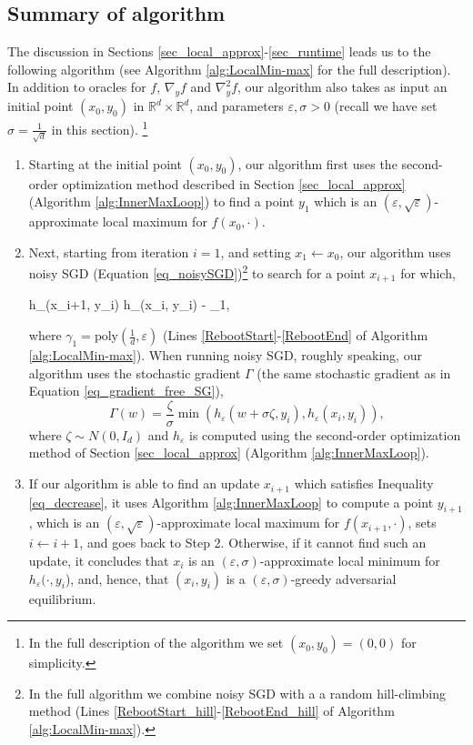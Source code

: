 \documentclass[11pt,letterpaper]{article}
\renewcommand{\epsilon}{\varepsilon}
\def \be{\begin{equs}}
\def \ee{\end{equs}}
\begin{document}
\subsection{Summary of algorithm}
The discussion in Sections \ref{sec_local_approx}-\ref{sec_runtime} leads us to the following algorithm (see Algorithm \ref{alg:LocalMin-max} for the full description). 
%
%
In addition to oracles for $f$, $\nabla_y f$ and $\nabla^2_y f$, our algorithm also takes as input an initial point $(x_0, y_0)$ in $\mathbb{R}^d \times \mathbb{R}^d$, and parameters $\epsilon, \sigma >0$  (recall we have set $\sigma = \frac{1}{\sqrt{d}}$ in this section). \footnote{In the full description of the algorithm we set  $(x_0, y_0) = (0, 0)$ for simplicity.}

\begin{enumerate}
\item  Starting at the initial point $(x_0, y_0)$, our algorithm first uses the second-order optimization method described in Section \ref{sec_local_approx} (Algorithm \ref{alg:InnerMaxLoop}) to find a point $y_1$ which is an  $(\epsilon, \sqrt{\epsilon})$-approximate local maximum for $f(x_0, \cdot)$.

\item Next, starting from iteration $i=1$, and setting $x_1 \leftarrow x_0$,  our algorithm uses noisy SGD (Equation \eqref{eq_noisySGD})\footnote{In the full algorithm we combine noisy SGD with a a random hill-climbing method (Lines \ref{RebootStart_hill}-\ref{RebootEnd_hill}  of Algorithm \ref{alg:LocalMin-max}).}
 to search for a point $x_{i+1}$ for which,
\be \label{eq_decrease}
 h_\epsilon(x_{i+1}, y_{i}) \leq h_\epsilon(x_i, y_{i})  - \gamma_1,
\ee
   where $\gamma_1 = \mathrm{poly}(\frac{1}{d},  \epsilon)$ (Lines \ref{RebootStart}-\ref{RebootEnd} of Algorithm \ref{alg:LocalMin-max}).
   When running noisy SGD, roughly speaking, our algorithm uses the stochastic gradient $\Gamma$ (the same stochastic gradient as in Equation \eqref{eq_gradient_free_SG}),
   \begin{equation}
 \Gamma(w) = \frac{\zeta}{\sigma} \min \left(h_\epsilon(w + \sigma \zeta, y_{i}), h_\epsilon(x_i,y_{i})\right),
\end{equation}
%
%
where $\zeta \sim N(0,I_d)$ and $h_\epsilon$ is computed using the second-order optimization method of Section \ref{sec_local_approx} (Algorithm \ref{alg:InnerMaxLoop}).
  
  
  \item
%
If our algorithm is able to find an update $x_{i+1}$ which satisfies Inequality \eqref{eq_decrease}, it uses Algorithm \ref{alg:InnerMaxLoop} to compute a point $y_{i+1}$, which is an $(\epsilon, \sqrt{\epsilon})$-approximate local maximum for $f(x_{i+1},\cdot)$,
%
 sets $i\leftarrow i+1$,  and goes back to Step 2.
% 
  Otherwise, if it cannot find such an update, it concludes that $x_i$ is an $(\epsilon, \sigma)$-approximate local minimum for $h_\epsilon(\cdot ,y_{i}$), and, hence, that $(x_i,y_{i})$ is a  $(\epsilon, \sigma)$-greedy adversarial equilibrium.
\end{enumerate}
\end{document}
